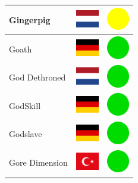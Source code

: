 \documentclass[12pt, a4paper, twoside]{report}
\begin{document}
\begin{center}
\begin{longtable}{|p{5cm}|p{2cm}|p{2cm}|}
			Gingerpig & \includegraphics[width=1cm]{4x3/nl} & \includegraphics[width=1cm]{likes/m} \\ \hline
			Goath & \includegraphics[width=1cm]{4x3/de} & \includegraphics[width=1cm]{likes/y} \\ \hline
			God Dethroned & \includegraphics[width=1cm]{4x3/nl} & \includegraphics[width=1cm]{likes/y} \\ \hline
			GodSkill & \includegraphics[width=1cm]{4x3/de} & \includegraphics[width=1cm]{likes/y} \\ \hline
			Godslave & \includegraphics[width=1cm]{4x3/de} & \includegraphics[width=1cm]{likes/y} \\ \hline
			Gore Dimension & \includegraphics[width=1cm]{4x3/tr} & \includegraphics[width=1cm]{likes/y} \\ \hline

\end{longtable}
\end{center}
\end{document}
